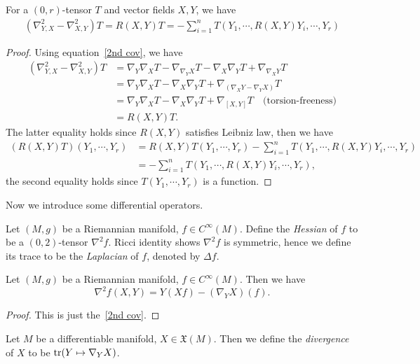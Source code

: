 \begin{prop}\label{Ricci identity}
    For a $(0,r)$-tensor $T$ and vector fields $X,Y$, we have
    \begin{align*}
        (\nabla^2_{Y,X}-\nabla^2_{X,Y})T=R(X,Y)T=-\sum_{i=1}^nT(Y_1,\cdots,R(X,Y)Y_i,\cdots,Y_r)
    \end{align*}
\end{prop}
\begin{proof}
    Using equation~\eqref{2nd cov}, we have
    \begin{align*}
        (\nabla^2_{Y,X}-\nabla^2_{X,Y})T&=\nabla_Y\nabla_XT-\nabla_{\nabla_YX}T-\nabla_X\nabla_YT+\nabla_{\nabla_XY}T\\
        &=\nabla_Y\nabla_XT-\nabla_X\nabla_YT+\nabla_{(\nabla_XY-\nabla_YX)}T\\
        &=\nabla_Y\nabla_XT-\nabla_X\nabla_YT+\nabla_{[X,Y]}T\quad\text{(torsion-freeness)}\\
        &=R(X,Y)T.
    \end{align*}
    The latter equality holds since $R(X,Y)$ satisfies Leibniz law, then we have
    \begin{align*}
        (R(X,Y)T)(Y_1,\cdots,Y_r)&=R(X,Y)T(Y_1,\cdots,Y_r)-\sum_{i=1}^nT(Y_1,\cdots,R(X,Y)Y_i,\cdots,Y_r)\\
        &=-\sum_{i=1}^nT(Y_1,\cdots,R(X,Y)Y_i,\cdots,Y_r),
    \end{align*}
    the second equality holds since $T(Y_1,\cdots,Y_r)$ is a function.
\end{proof}

Now we introduce some differential operators.

\begin{defn}
    Let $(M,g)$ be a Riemannian manifold, $f\in C^\infty(M)$.
    Define the \emph{Hessian} of $f$ to be a $(0,2)$-tensor $\nabla^2f$.
    Ricci identity shows $\nabla^2f$ is symmetric, hence we define its trace to be the \emph{Laplacian} of $f$, denoted by $\Delta f$.
\end{defn}

\begin{prop}
    Let $(M,g)$ be a Riemannian manifold, $f\in C^\infty(M)$.
    Then we have
    \[\nabla^2f(X,Y)=Y(Xf)-(\nabla_YX)(f).\]
\end{prop}
\begin{proof}
    This is just the~\eqref{2nd cov}.
\end{proof}

\begin{defn}
    Let $M$ be a differentiable manifold, $X\in\mathfrak{X}(M)$.
    Then we define the \emph{divergence} of $X$ to be $\operatorname{tr}(Y\mapsto\nabla_YX)$.
\end{defn}

